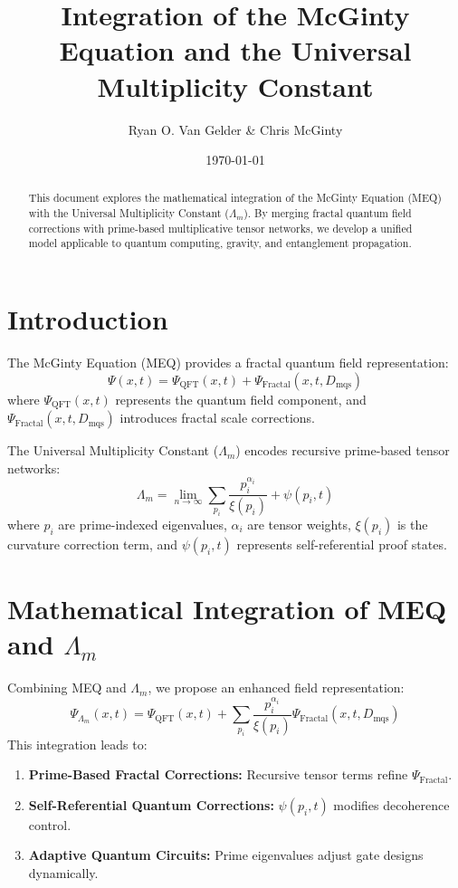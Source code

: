 \documentclass{article}
\title{Integration of the McGinty Equation and the Universal Multiplicity Constant}
\author{Ryan O. Van Gelder \& Chris McGinty}
\date{\today}
\theoremstyle{plain}
\begin{document}
\maketitle

\begin{abstract}
This document explores the mathematical integration of the McGinty Equation (MEQ) with the Universal Multiplicity Constant ($\Lambda_m$). By merging fractal quantum field corrections with prime-based multiplicative tensor networks, we develop a unified model applicable to quantum computing, gravity, and entanglement propagation.
\end{abstract}

\section{Introduction}
The McGinty Equation (MEQ) provides a fractal quantum field representation:
\begin{equation}
    \Psi(x,t) = \Psi_{\text{QFT}}(x,t) + \Psi_{\text{Fractal}}(x,t,D_{\text{mqs}})
\end{equation}
where $\Psi_{\text{QFT}}(x,t)$ represents the quantum field component, and $\Psi_{\text{Fractal}}(x,t,D_{\text{mqs}})$ introduces fractal scale corrections.

The Universal Multiplicity Constant ($\Lambda_m$) encodes recursive prime-based tensor networks:
\begin{equation}
    \Lambda_m = \lim_{n \to \infty} \sum_{p_i} \frac{p_i^{\alpha_i}}{\xi(p_i)} + \psi(p_i, t)
\end{equation}
where $p_i$ are prime-indexed eigenvalues, $\alpha_i$ are tensor weights, $\xi(p_i)$ is the curvature correction term, and $\psi(p_i, t)$ represents self-referential proof states.

\section{Mathematical Integration of MEQ and $\Lambda_m$}
Combining MEQ and $\Lambda_m$, we propose an enhanced field representation:
\begin{equation}
    \Psi_{\Lambda_m}(x,t) = \Psi_{\text{QFT}}(x,t) + \sum_{p_i} \frac{p_i^{\alpha_i}}{\xi(p_i)} \Psi_{\text{Fractal}}(x,t,D_{\text{mqs}})
\end{equation}
This integration leads to:
\begin{enumerate}
    \item \textbf{Prime-Based Fractal Corrections:} Recursive tensor terms refine $\Psi_{\text{Fractal}}$.
    \item \textbf{Self-Referential Quantum Corrections:} $\psi(p_i, t)$ modifies decoherence control.
    \item \textbf{Adaptive Quantum Circuits:} Prime eigenvalues adjust gate designs dynamically.
\end{enumerate}
\end{document}
